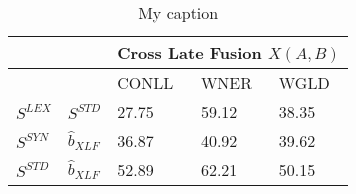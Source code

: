 \begin{table}[]
\begin{tabular}{@{}lllll@{}}
\midrule
          &           & \multicolumn{3}{c}{Cross Late Fusion $X(A,B)$}  \\
\midrule
          &           & CONLL                      & WNER                      & WGLD                      \\ \cmidrule{3-5}
$S^{LEX}$ & $S^{STD}$ & 27.75                      & 59.12                     & 38.35                     \\
$S^{SYN}$ & $\hat{b}_{\scriptscriptstyle XLF}$       & 36.87                      & 40.92                     & 39.62                     \\
$S^{STD}$ & $\hat{b}_{\scriptscriptstyle XLF}$        & 52.89                      & 62.21                     & 50.15                     \\ \bottomrule
\end{tabular}
\caption{My caption}
\end{table}



